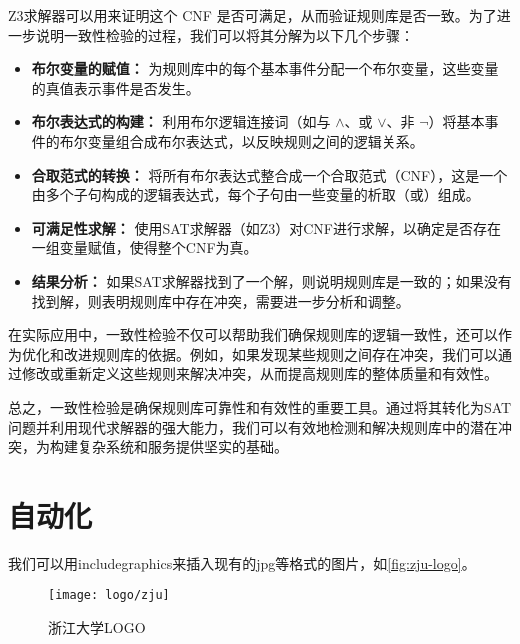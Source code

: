 Z3求解器可以用来证明这个 CNF 是否可满足，从而验证规则库是否一致。为了进一步说明一致性检验的过程，我们可以将其分解为以下几个步骤：

\begin{itemize}
    \item \textbf{布尔变量的赋值：} 为规则库中的每个基本事件分配一个布尔变量，这些变量的真值表示事件是否发生。
    \item \textbf{布尔表达式的构建：} 利用布尔逻辑连接词（如与 $\land$、或 $\lor$、非 $\neg$）将基本事件的布尔变量组合成布尔表达式，以反映规则之间的逻辑关系。
    \item \textbf{合取范式的转换：} 将所有布尔表达式整合成一个合取范式（CNF），这是一个由多个子句构成的逻辑表达式，每个子句由一些变量的析取（或）组成。
    \item \textbf{可满足性求解：} 使用SAT求解器（如Z3）对CNF进行求解，以确定是否存在一组变量赋值，使得整个CNF为真。
    \item \textbf{结果分析：} 如果SAT求解器找到了一个解，则说明规则库是一致的；如果没有找到解，则表明规则库中存在冲突，需要进一步分析和调整。
\end{itemize}

在实际应用中，一致性检验不仅可以帮助我们确保规则库的逻辑一致性，还可以作为优化和改进规则库的依据。例如，如果发现某些规则之间存在冲突，我们可以通过修改或重新定义这些规则来解决冲突，从而提高规则库的整体质量和有效性。

总之，一致性检验是确保规则库可靠性和有效性的重要工具。通过将其转化为SAT问题并利用现代求解器的强大能力，我们可以有效地检测和解决规则库中的潜在冲突，为构建复杂系统和服务提供坚实的基础。

\cleardoublepage

\section{自动化}


















\par 我们可以用includegraphics来插入现有的jpg等格式的图片，如\autoref{fig:zju-logo}。

\begin{figure}[ht]
    \centering
    \texttt{[image: logo/zju]}
    \caption{\label{fig:zju-logo}浙江大学LOGO}
\end{figure}

